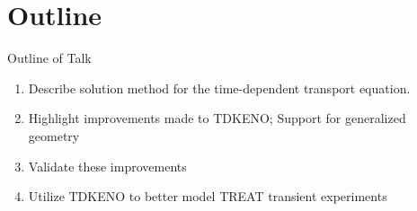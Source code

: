 \section{Outline}

\begin{frame}{Outline of Talk}

\begin{enumerate}[<+-| alert@+>]
    \item Describe solution method for the time-dependent transport equation.
    \item Highlight improvements made to TDKENO; Support for generalized geometry
    \item Validate these improvements 
    \item Utilize TDKENO  to better model TREAT transient experiments
\end{enumerate}

    
\end{frame}
